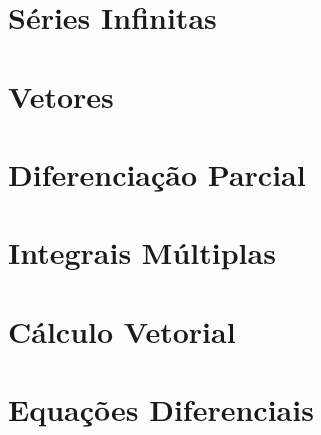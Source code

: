 \documentclass{svmono}
\begin{document}
\begin{chapterproblems}
\end{chapterproblems}

\chapter{Séries Infinitas}
\label{chp:infseries}

\begin{chapterproblems}
\end{chapterproblems}

\chapter{Vetores}
\label{chp:vectors}

\begin{chapterproblems}
\end{chapterproblems}

\chapter{Diferenciação Parcial}
\label{chp:partialdiff}

\begin{chapterproblems}
\end{chapterproblems}

\chapter{Integrais Múltiplas}
\label{chp:multipleint}

\begin{chapterproblems}
\end{chapterproblems}

\chapter{Cálculo Vetorial}
\label{chp:vectorcalculus}

\begin{chapterproblems}
\end{chapterproblems}

\chapter{Equações Diferenciais}
\label{chp:diffeq}

\begin{chapterproblems}
\end{chapterproblems}
\end{document}
